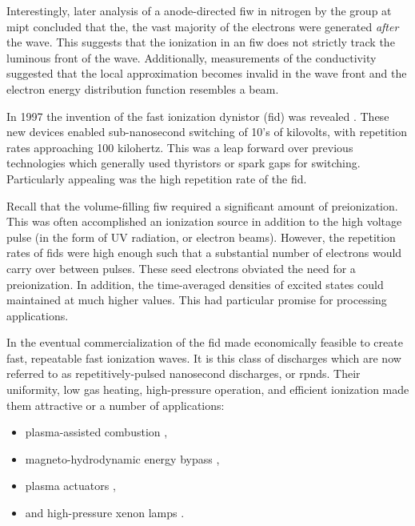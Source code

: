 Interestingly, later analysis of a anode-directed \acs{fiw} in nitrogen by the
group at \acs{mipt} \cite{Pancheshnyi1999} concluded that the, the vast majority
of the electrons were generated \emph{after} the wave. This suggests that the
ionization in an \acs{fiw} does not strictly track the luminous front of the
wave. Additionally, measurements of the conductivity suggested that the local
approximation becomes invalid in the wave front and the electron energy
distribution function resembles a beam.

In 1997 the invention of the fast ionization dynistor (\acs{fid}) was revealed
\cite{Efanov1997}. These new devices enabled sub-nanosecond switching of 10's of
kilovolts, with repetition rates approaching 100 kilohertz. This was a leap
forward over previous technologies which generally used thyristors or spark gaps
for switching. Particularly appealing was the high repetition rate of the
\acs{fid}.

Recall that the volume-filling \acs{fiw} required a significant
amount of preionization. This was often accomplished an ionization source in
addition to the high voltage pulse (in the form of UV radiation, or electron
beams). However, the repetition rates of \acs{fid}s were high enough such that a
substantial number of electrons would carry over between pulses. These seed
electrons obviated the need for a preionization. In addition, the time-averaged
densities of excited states could maintained at much higher values. This had
particular promise for processing applications.

In the eventual commercialization of the \acs{fid} made economically feasible to
create fast, repeatable fast ionization waves. It is this class of discharges
which are now referred to as repetitively-pulsed nanosecond discharges, or
\acs{rpnd}s. Their uniformity, low gas heating, high-pressure operation, and
efficient ionization made them attractive or a number of applications:
\begin{itemize}
  \item plasma-assisted combustion \cite{Starikovskaia2006},
  \item magneto-hydrodynamic energy bypass \cite{Macheret2002},
  \item plasma actuators \cite{Adamovich2009},
  \item and high-pressure xenon lamps \cite{Nikandrov2008, Tsendin2009}.
\end{itemize}

